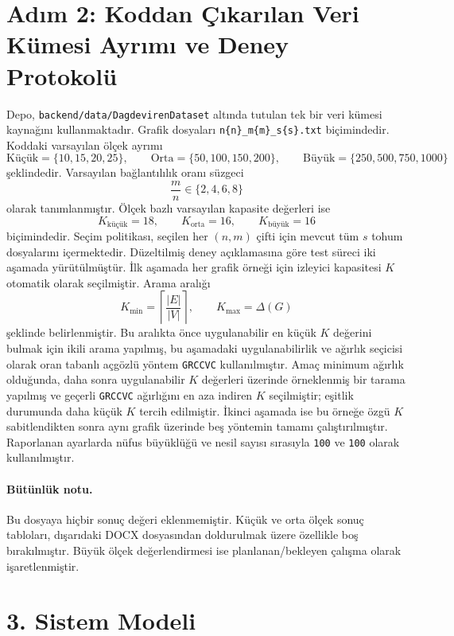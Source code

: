 \documentclass[11pt]{article}
\begin{document}
\section*{Adım 2: Koddan Çıkarılan Veri Kümesi Ayrımı ve Deney Protokolü}

Depo, \texttt{backend/data/DagdevirenDataset} altında tutulan tek bir veri kümesi kaynağını kullanmaktadır. Grafik dosyaları \texttt{n\{n\}\_m\{m\}\_s\{s\}.txt} biçimindedir. Koddaki varsayılan ölçek ayrımı
\[
\text{Küçük}=\{10,15,20,25\},\qquad
\text{Orta}=\{50,100,150,200\},\qquad
\text{Büyük}=\{250,500,750,1000\}
\]
şeklindedir. Varsayılan bağlantılılık oranı süzgeci
\[
\frac{m}{n}\in\{2,4,6,8\}
\]
olarak tanımlanmıştır. Ölçek bazlı varsayılan kapasite değerleri ise
\[
K_{\text{küçük}}=18,\qquad K_{\text{orta}}=16,\qquad K_{\text{büyük}}=16
\]
biçimindedir. Seçim politikası, seçilen her \((n,m)\) çifti için mevcut tüm \(s\) tohum dosyalarını içermektedir. Düzeltilmiş deney açıklamasına göre test süreci iki aşamada yürütülmüştür. İlk aşamada her grafik örneği için izleyici kapasitesi \(K\) otomatik olarak seçilmiştir. Arama aralığı
\[
K_{\min}=\left\lceil \frac{|E|}{|V|}\right\rceil,\qquad K_{\max}=\Delta(G)
\]
şeklinde belirlenmiştir. Bu aralıkta önce uygulanabilir en küçük \(K\) değerini bulmak için ikili arama yapılmış, bu aşamadaki uygulanabilirlik ve ağırlık seçicisi olarak oran tabanlı açgözlü yöntem \texttt{GRCCVC} kullanılmıştır. Amaç minimum ağırlık olduğunda, daha sonra uygulanabilir \(K\) değerleri üzerinde örneklenmiş bir tarama yapılmış ve geçerli \texttt{GRCCVC} ağırlığını en aza indiren \(K\) seçilmiştir; eşitlik durumunda daha küçük \(K\) tercih edilmiştir. İkinci aşamada ise bu örneğe özgü \(K\) sabitlendikten sonra aynı grafik üzerinde beş yöntemin tamamı çalıştırılmıştır. Raporlanan ayarlarda nüfus büyüklüğü ve nesil sayısı sırasıyla \texttt{100} ve \texttt{100} olarak kullanılmıştır.

\paragraph{Bütünlük notu.}
Bu dosyaya hiçbir sonuç değeri eklenmemiştir. Küçük ve orta ölçek sonuç tabloları, dışarıdaki DOCX dosyasından doldurulmak üzere özellikle boş bırakılmıştır. Büyük ölçek değerlendirmesi ise planlanan/bekleyen çalışma olarak işaretlenmiştir.

\section*{3. Sistem Modeli}
\end{document}
